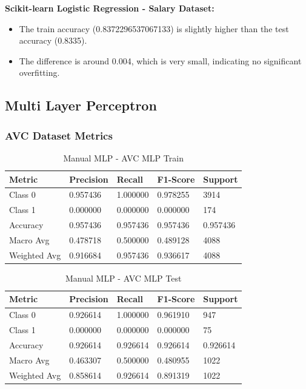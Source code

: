 \documentclass[a4paper,12pt]{article}
\begin{document}
\textbf{Scikit-learn Logistic Regression - Salary Dataset:}
\begin{itemize}
    \item The train accuracy (0.8372296537067133) is slightly higher than the test accuracy (0.8335).
    \item The difference is around 0.004, which is very small, indicating no significant overfitting.
\end{itemize}


\subsection{Multi Layer Perceptron}

\subsubsection{AVC Dataset Metrics}

\begin{table}[h!]
    \centering
    \caption{Manual MLP - AVC MLP Train}
    \begin{tabularx}{\textwidth}{|l|X|X|X|X|}
    \hline
    \textbf{Metric} & \textbf{Precision} & \textbf{Recall} & \textbf{F1-Score} & \textbf{Support} \\
    \hline
    Class 0 & 0.957436 & 1.000000 & 0.978255 & 3914 \\
    Class 1 & 0.000000 & 0.000000 & 0.000000 & 174 \\
    Accuracy & 0.957436 & 0.957436 & 0.957436 & 0.957436 \\
    Macro Avg & 0.478718 & 0.500000 & 0.489128 & 4088 \\
    Weighted Avg & 0.916684 & 0.957436 & 0.936617 & 4088 \\
    \hline
    \end{tabularx}
\end{table}

\begin{table}[h!]
    \centering
    \caption{Manual MLP - AVC MLP Test}
    \begin{tabularx}{\textwidth}{|l|X|X|X|X|}
    \hline
    \textbf{Metric} & \textbf{Precision} & \textbf{Recall} & \textbf{F1-Score} & \textbf{Support} \\
    \hline
    Class 0 & 0.926614 & 1.000000 & 0.961910 & 947 \\
    Class 1 & 0.000000 & 0.000000 & 0.000000 & 75 \\
    Accuracy & 0.926614 & 0.926614 & 0.926614 & 0.926614 \\
    Macro Avg & 0.463307 & 0.500000 & 0.480955 & 1022 \\
    Weighted Avg & 0.858614 & 0.926614 & 0.891319 & 1022 \\
    \hline
    \end{tabularx}
\end{table}
\end{document}
